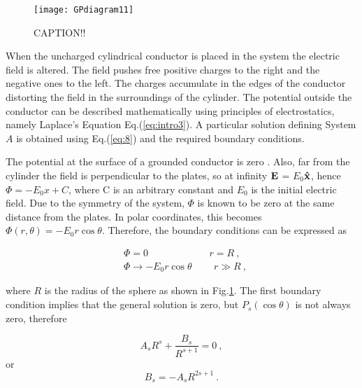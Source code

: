 \documentclass[a4paper]{jpconf}
\begin{document}
\begin{figure}[h]
	\centering
	\texttt{[image: GPdiagram11]} 
	\caption{CAPTION!!}
	\label{fig:systemA}
\end{figure}

When the uncharged cylindrical conductor is placed in the system the electric field is altered. The field pushes free positive charges to the right and the negative ones to the left. The charges accumulate in the edges of the conductor distorting the field in the surroundings of the cylinder. The potential outside the conductor can be described mathematically using principles of electrostatics, namely Laplace's Equation Eq.(\ref{eq:intro3}). %
A particular solution defining System $A$ is obtained using Eq.(\ref{eq:8}) and the required boundary conditions. 


The potential at the surface of a grounded conductor is zero \cite{griffiths-introElec}. Also, far from the cylinder the field is perpendicular to the plates, so at infinity $\bf{E}$ = $E_0$$\bf{\hat{x}}$, hence $\Phi = -E_0 x + C$, where C is an arbitrary constant and $E_0$ is the initial electric field. Due to the symmetry of the system, $\Phi$ is known to be zero at the same distance from the plates. In polar coordinates, this becomes $\Phi(r,\theta) = -E_0 r \cos \theta$. Therefore, the boundary conditions can be expressed as

\begin{subequations}
\begin{align}
&\Phi = 0  \hspace{75pt} r = R~,\\ 
&\Phi \to -E_0 r \cos \theta \hspace{27pt} r \gg R~,
\end{align}
\end{subequations}

\noindent where $R$ is the radius of the sphere as shown in Fig.\ref{fig:systemA}. The first boundary condition implies that the general solution is zero, but $P_s(\cos \theta)$ is not always zero, therefore

\begin{equation}
A_s R^s + \frac{B_s}{R^{s+1}} = 0~,
\end{equation}
or
\begin{equation}
B_s = -A_s R^{2s+1}~.
\end{equation}
\end{document}
